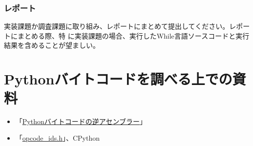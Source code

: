 \documentclass[a4paper,11pt]{jsarticle}
\begin{document}
\subsubsection{レポート}

実装課題か調査課題に取り組み、レポートにまとめて提出してください。レポートにまとめる際、特
に実装課題の場合、実行したWhile言語ソースコードと実行結果を含めることが望ましい。

\section{Pythonバイトコードを調べる上での資料}

\begin{itemize}
\item 「\href{https://docs.python.org/ja/3/library/dis.html}{Pythonバイトコードの逆アセンブラー}」
\item 「\href{https://github.com/python/cpython/blob/main/Include/opcode_ids.h}{opcode\_ids.h}」、CPython
\end{itemize}
\end{document}
